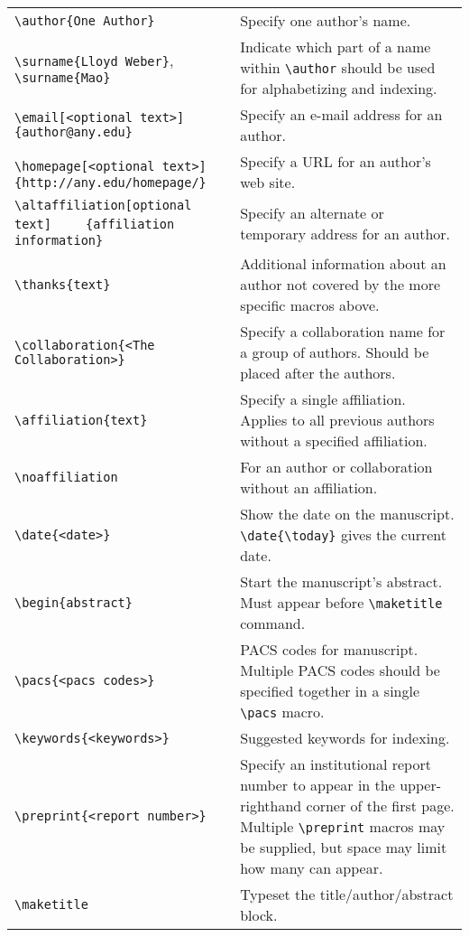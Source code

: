 \documentclass[%
twocolumn,secnumarabic,amssymb, amsmath, nofootinbib,tightenlines,
nobibnotes, aps, 
prl,
]{revtex4-1}
\begin{document}
\begin{longtable*}{@{\extracolsep{0in}}p{3in}p{4in}}
\verb+\author{One Author}+ & Specify one author's name.\\
\verb+\surname{Lloyd Weber}+, \verb+\surname{Mao}+ & Indicate which part of a name within
\verb+\author+ should be used for alphabetizing and indexing.\\
\verb+\email[<optional text>]{author@any.edu}+& Specify an e-mail address for an author.\\
\verb+\homepage[<optional text>]+ \verb+    {http://any.edu/homepage/}+& Specify a URL for an author's web site.\\
\verb+\altaffiliation[optional text]+ \verb+    {affiliation information}+&Specify an alternate or temporary address for an author.\\
\verb+\thanks{text}+& Additional information about an author not covered by the more specific macros above.\\
\verb+\collaboration{<The Collaboration>}+ & Specify a collaboration name for a group of authors. Should be placed after the authors. \\
\verb+\affiliation{text}+ & Specify a single affiliation. Applies to all previous authors without a specified affiliation.\\
\verb+\noaffiliation+ & For an author or collaboration without an affiliation.\\
\verb+\date{<date>}+ &  Show the date on the manuscript. \verb+\date{\today}+ gives the current date.\\
\verb+\begin{abstract}+ & Start the manuscript's abstract. Must appear before \verb+\maketitle+ command.\\
\verb+\pacs{<pacs codes>}+& PACS codes for manuscript. Multiple PACS codes should be specified together in a single \verb+\pacs+ macro.\\
\verb+\keywords{<keywords>}+ & Suggested keywords for indexing.\\
\verb+\preprint{<report number>}+ & Specify an institutional report number to appear in the upper-righthand corner of the first page. Multiple 
\verb+\preprint+ macros may be supplied, but space may limit how many can appear.\\
\verb+\maketitle+ & Typeset the title/author/abstract block.\\

\end{longtable*}
\end{document}
